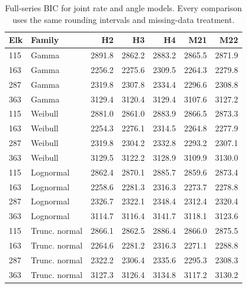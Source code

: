 \begin{table}[tbp]
\centering\small
\caption{Full-series BIC for joint rate and angle models. Every comparison uses the same rounding intervals and missing-data treatment.}
\label{tab:movement-joint}
\begin{tabular}{llrrrrr}
\toprule
Elk & Family & H2 & H3 & H4 & M21 & M22 \\
\midrule
115 & Gamma & 2891.8 & 2862.2 & 2883.2 & 2865.5 & 2871.9 \\
163 & Gamma & 2256.2 & 2275.6 & 2309.5 & 2264.3 & 2279.8 \\
287 & Gamma & 2319.8 & 2307.8 & 2334.4 & 2296.6 & 2308.8 \\
363 & Gamma & 3129.4 & 3120.4 & 3129.4 & 3107.6 & 3127.2 \\
115 & Weibull & 2881.0 & 2861.0 & 2883.9 & 2866.5 & 2873.3 \\
163 & Weibull & 2254.3 & 2276.1 & 2314.5 & 2264.8 & 2277.9 \\
287 & Weibull & 2319.8 & 2304.2 & 2332.8 & 2293.2 & 2307.1 \\
363 & Weibull & 3129.5 & 3122.2 & 3128.9 & 3109.9 & 3130.0 \\
115 & Lognormal & 2862.4 & 2870.1 & 2885.7 & 2859.6 & 2873.4 \\
163 & Lognormal & 2258.6 & 2281.3 & 2316.3 & 2273.7 & 2278.8 \\
287 & Lognormal & 2326.7 & 2322.1 & 2348.4 & 2312.4 & 2320.4 \\
363 & Lognormal & 3114.7 & 3116.4 & 3141.7 & 3118.1 & 3123.6 \\
115 & Trunc. normal & 2866.1 & 2862.5 & 2886.4 & 2866.0 & 2875.5 \\
163 & Trunc. normal & 2264.6 & 2281.2 & 2316.3 & 2271.1 & 2288.8 \\
287 & Trunc. normal & 2322.2 & 2306.4 & 2335.6 & 2295.3 & 2308.3 \\
363 & Trunc. normal & 3127.3 & 3126.4 & 3134.8 & 3117.2 & 3130.2 \\
\bottomrule
\end{tabular}
\end{table}
